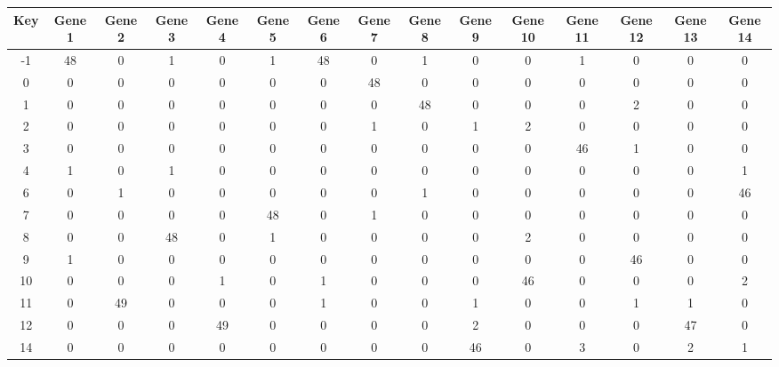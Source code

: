 \begin{tabular}{|c|c|c|c|c|c|c|c|c|c|c|c|c|c|c|}
\hline
Key & Gene 1 & Gene 2 & Gene 3 & Gene 4 & Gene 5 & Gene 6 & Gene 7 & Gene 8 & Gene 9 & Gene 10 & Gene 11 & Gene 12 & Gene 13 & Gene 14 \\
\hline
-1 & 48 & 0 & 1 & 0 & 1 & 48 & 0 & 1 & 0 & 0 & 1 & 0 & 0 & 0 \\
0 & 0 & 0 & 0 & 0 & 0 & 0 & 48 & 0 & 0 & 0 & 0 & 0 & 0 & 0 \\
1 & 0 & 0 & 0 & 0 & 0 & 0 & 0 & 48 & 0 & 0 & 0 & 2 & 0 & 0 \\
2 & 0 & 0 & 0 & 0 & 0 & 0 & 1 & 0 & 1 & 2 & 0 & 0 & 0 & 0 \\
3 & 0 & 0 & 0 & 0 & 0 & 0 & 0 & 0 & 0 & 0 & 46 & 1 & 0 & 0 \\
4 & 1 & 0 & 1 & 0 & 0 & 0 & 0 & 0 & 0 & 0 & 0 & 0 & 0 & 1 \\
6 & 0 & 1 & 0 & 0 & 0 & 0 & 0 & 1 & 0 & 0 & 0 & 0 & 0 & 46 \\
7 & 0 & 0 & 0 & 0 & 48 & 0 & 1 & 0 & 0 & 0 & 0 & 0 & 0 & 0 \\
8 & 0 & 0 & 48 & 0 & 1 & 0 & 0 & 0 & 0 & 2 & 0 & 0 & 0 & 0 \\
9 & 1 & 0 & 0 & 0 & 0 & 0 & 0 & 0 & 0 & 0 & 0 & 46 & 0 & 0 \\
10 & 0 & 0 & 0 & 1 & 0 & 1 & 0 & 0 & 0 & 46 & 0 & 0 & 0 & 2 \\
11 & 0 & 49 & 0 & 0 & 0 & 1 & 0 & 0 & 1 & 0 & 0 & 1 & 1 & 0 \\
12 & 0 & 0 & 0 & 49 & 0 & 0 & 0 & 0 & 2 & 0 & 0 & 0 & 47 & 0 \\
14 & 0 & 0 & 0 & 0 & 0 & 0 & 0 & 0 & 46 & 0 & 3 & 0 & 2 & 1 \\
\hline
\end{tabular}